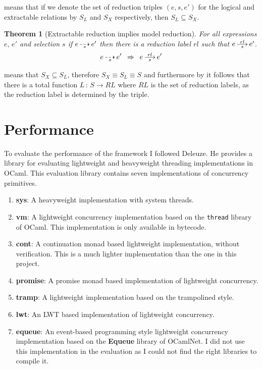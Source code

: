 \documentclass[12pt,twoside,notitlepage]{report}
\newcommand{\red}[2]{\stackon[.05ex]{\stackunder[-0.05ex]{$\longrightarrow$}{$\scriptstyle #1$}}{$\scriptstyle #2$}}
\newcommand{\xred}[1]{\stackunder[-0.05ex]{$\dashrightarrow$}{$\scriptstyle #1$}}
\theoremstyle{plain}%
\newtheorem{thm}{Theorem}[section]
\theoremstyle{definition}
\theoremstyle{remark}
\begin{document}
 means that if we denote the set of reduction triples $ (e,s,e') $ for the logical and extractable relations by $ S_L $ and $ S_X $ respectively, then $ S_L \subseteq S_X $.

\begin{thm}[Extractable reduction implies model reduction]
\label{thm:xjo_to_jo}
For all expressions $ e,\,e' $ and selection $ s $ if $ e\, \xred{s}\, e' $ then there is a reduction label $ rl $ such that $ e\, \red{s}{rl}\, e' $.
\[ e\, \xred{s}\, e' \,\,\,\Rightarrow \,\,\,  e\, \red{s}{rl}\, e' \]
\end{thm}

 means that $ S_X \subseteq S_L $, therefore $ S_X \equiv S_L \equiv S $ and furthermore by  it follows that there is a total function $ L\,:\, S \rightarrow RL $ where $ RL $ is the set of reduction labels, as the reduction label is determined by the triple.

\section{Performance}
\label{sec:performance_eval}
To evaluate the performance of the framework I followed Deleuze\cite{deleuzelight}. He provides a library for evaluating lightweight and heavyweight threading implementations in OCaml. This evaluation library contains seven implementations of concurrency primitives.
\begin{enumerate}
\item{\textbf{sys}: A heavyweight implementation with system threads.}
\item{\textbf{vm}: A lightweight concurrency implementation based on the \verb|thread| library of OCaml. This implementation is only available in bytecode.}
\item{\textbf{cont}: A continuation monad based lightweight implementation\cite[p.~12-13]{deleuzelight}, without verification. This is a much lighter implementation than the one in this project.}
\item{\textbf{promise}: A promise monad based implementation of lightweight concurrency\cite[p.~13-15]{deleuzelight}.}
\item{\textbf{tramp}: A lightweight implementation based on the trampolined style\cite[p.~11-12]{deleuzelight}.}
\item{\textbf{lwt}: An LWT\cite{LWT} based implementation of lightweight concurrency.}
\item{\textbf{equeue}: An event-based programming style lightweight concurrency implementation\cite[p.~15-18]{deleuzelight} based on the \textbf{Equeue} library of OCamlNet. I did not use this implementation in the evaluation as I could not find the right libraries to compile it.}
\end{enumerate}
\end{document}
